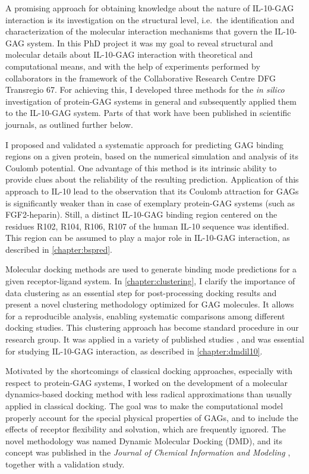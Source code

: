A promising approach for obtaining knowledge about the nature of IL-10-GAG
interaction is its investigation on the structural level, i.e.\ the
identification and characterization of the molecular interaction mechanisms that
govern the IL-10-GAG system. In this PhD project it was my goal to reveal
structural and molecular details about IL-10-GAG interaction with theoretical
and computational means, and with the help of experiments performed by
collaborators in the framework of the Collaborative Research Centre DFG
Transregio 67. For achieving this, I developed three methods for the
\textit{in silico} investigation of protein-GAG systems in general and
subsequently applied them to the IL-10-GAG system. Parts of that work have been
published in scientific journals, as outlined further below.

I proposed and validated a systematic approach for predicting GAG binding
regions on a given protein, based on the numerical simulation and analysis of
its Coulomb potential. One advantage of this method is its intrinsic ability to
provide clues about the reliability of the resulting prediction. Application of
this approach to IL-10 lead to the observation that its Coulomb attraction for
GAGs is significantly weaker than in case of exemplary protein-GAG systems (such
as FGF2-heparin). Still, a distinct IL-10-GAG binding region centered on the
residues R102, R104, R106, R107 of the human IL-10 sequence was identified. This
region can be assumed to play a major role in IL-10-GAG interaction, as
described in \cref{chapter:bspred}.

Molecular docking methods are used to generate binding mode predictions for a
given receptor-ligand system. In \cref{chapter:clustering}, I clarify the
importance of data clustering as an essential step for post-processing docking
results and present a novel clustering methodology optimized for GAG molecules.
It allows for a reproducible analysis, enabling systematic comparisons among
different docking studies. This clustering approach has become standard
procedure in our research group. It was applied in a variety of published
studies \cite{franz_cathepsin_2013, hintze_sergey_2014, Samsonov_rings_cr_2013,
SalbachHirsch20137653, vanderSmissen2013}, and was essential for studying
IL-10-GAG interaction, as described in \cref{chapter:dmdil10}.

Motivated by the shortcomings of classical docking approaches, especially with
respect to protein-GAG systems, I worked on the development of a molecular
dynamics-based docking method with less radical approximations than usually
applied in classical docking. The goal was to make the computational model
properly account for the special physical properties of GAGs, and to include the
effects of receptor flexibility and solvation, which are frequently ignored. The
novel methodology was named Dynamic Molecular Docking (DMD), and its concept was
published in the \textit{Journal of Chemical Information and Modeling}
\cite{dmd_samsonov_gehrcke_2014}, together with a validation study.

